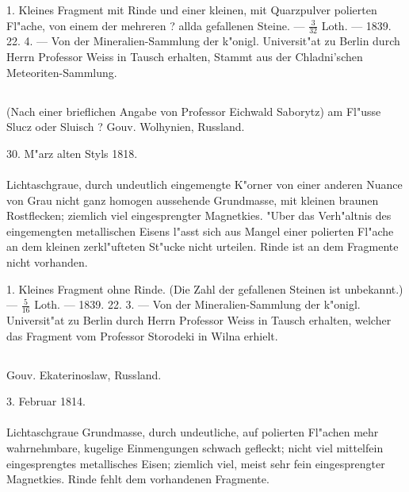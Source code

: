 \documentclass[a4paper, 11pt, oneside, polutonikogreek, german]{article}
\begin{document}
1. Kleines Fragment mit Rinde und einer kleinen, mit Quarzpulver polierten Fl"ache, von einem der mehreren ? allda gefallenen Steine. --- $\mathfrak{\frac{3}{32}}$ Loth. --- 1839. 22. 4. --- Von der Mineralien-Sammlung der k"onigl. Universit"at zu Berlin durch Herrn Professor Weiss in Tausch erhalten, Stammt aus der Chladni'schen Meteoriten-Sammlung.
\subsection{}
\begin{center}

(Nach einer brieflichen Angabe von Professor Eichwald Saborytz) am Fl"usse Slucz oder Sluisch ? Gouv. Wolhynien, Russland.

30. M"arz alten Styls 1818.
\end{center}
\paragraph{}
Lichtaschgraue, durch undeutlich eingemengte K"orner von einer anderen Nuance von Grau nicht ganz homogen aussehende Grundmasse, mit kleinen braunen Rostflecken; ziemlich viel eingesprengter Magnetkies. "Uber das Verh"altnis des eingemengten metallischen Eisens l"asst sich aus Mangel einer polierten Fl"ache an dem kleinen zerkl"ufteten St"ucke nicht urteilen. Rinde ist an dem Fragmente nicht vorhanden.

1. Kleines Fragment ohne Rinde. (Die Zahl der gefallenen Steinen ist unbekannt.) --- $\mathfrak{\frac{5}{16}}$ Loth. --- 1839. 22. 3. --- Von der Mineralien-Sammlung der k"onigl. Universit"at zu Berlin durch Herrn Professor Weiss in Tausch erhalten, welcher das Fragment vom Professor Storodeki in Wilna erhielt.
\subsection{}
\begin{center}

Gouv. Ekaterinoslaw, Russland.

3. Februar 1814.
\end{center}
\paragraph{}
Lichtaschgraue Grundmasse, durch undeutliche, auf polierten Fl"achen mehr wahrnehmbare, kugelige Einmengungen schwach gefleckt; nicht viel mittelfein eingesprengtes metallisches Eisen; ziemlich viel, meist sehr fein eingesprengter Magnetkies. Rinde fehlt dem vorhandenen Fragmente.
\end{document}

